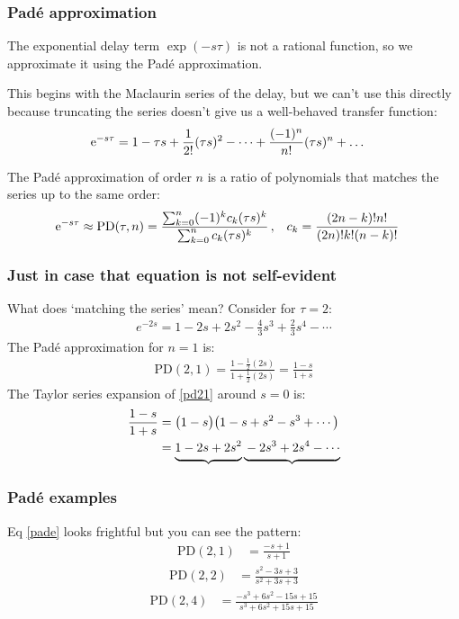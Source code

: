 \documentclass{beamer-control}
\begin{document}
\begin{frame}
\frametitle{Padé approximation}
The exponential delay term $\exp(-s\tau)$ is not a rational function,
so we approximate it using the \alert{Padé approximation}.

This begins with the Maclaurin series of the delay, but we can't use this directly because truncating the series doesn't give us a well-behaved transfer function:
\begin{align}
\mathrm{e}^{-s \tau} &= 1 - \tau s + \frac{1}{2!}(\tau s)^2 - \dots + \frac{(-1)^n}{n!}(\tau s)^n + \dots 
\end{align}

The Padé approximation of order $n$ is a ratio of polynomials that matches the series up to the same order:
\begin{align}\label{eq:pade}
\mathrm{e}^{-s \tau} &\approx \mathrm{PD}(\tau,n) = \frac{ \sum_{k=0}^n (-1)^k c_k (\tau s)^k  }
                            { \sum_{k=0}^n        c_k (\tau s)^k  } \,, &
          c_k &= \frac{ (2n-k)!n! }{ (2n)!k!(n-k)! }
\end{align}

\end{frame}

\begin{frame}
\frametitle{Just in case that equation is not self-evident}

What does `matching the series' mean? Consider for $\tau=2$:
\begin{align}
e^{-2s} = 1 - 2s + 2s^2 - \tfrac{4}{3}s^3 + \tfrac{2}{3}s^4 - \cdots
\end{align}
The Padé approximation for $n=1$ is:
\begin{align}\label{eq:pd21}
\mathrm{PD}(2,1) = \frac{1 - \frac{1}{2}(2s)}{1 + \frac{1}{2}(2s)} = \frac{1 - s}{1 + s}
\end{align}
The Taylor series expansion of \eqref{pd21} around $s=0$ is:
\begin{align}
\frac{1 - s}{1 + s} &= \bigl(1 - s\bigr)\bigl(1 - s + s^2 - s^3 + \cdots\bigr) \\
& = \underbrace{\strut 1 - 2s + 2s^2}  \underbrace{\strut -2s^3 + 2s^4 - \cdots}
\end{align}
\end{frame}

\begin{frame}
\frametitle{Padé examples}

Eq \eqref{pade} looks frightful but you can see the pattern:
\begin{align}
\mathrm{PD}(2,1) &= \frac{  -s + 1 }{  s + 1 } 
\end{align}
\begin{align}
\mathrm{PD}(2,2) &= \frac{  s^2 - 3 s + 3 }{  s^2 + 3 s + 3 } 
\end{align}
\begin{align}
\mathrm{PD}(2,4) &= \frac{ -s^3 + 6 s^2 - 15 s + 15 }{  s^3 + 6 s^2 + 15 s + 15 }
\end{align}
\end{frame}
\end{document}
